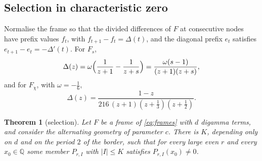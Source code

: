 \documentclass[11pt]{amsart}
\newtheorem{theorem}{Theorem}[section]
\theoremstyle{definition}
\theoremstyle{remark}
\numberwithin{equation}{section}
\newcommand{\Q}{\mathbb Q}
\begin{document}
\subsection{Selection in characteristic zero}\label{ssec:selection}
Normalise the frame so that the divided differences of $F$ at consecutive nodes have prefix values $f_t$, with
$f_{t+1}-f_t=\Delta(t)$, and the diagonal prefix $e_t$ satisfies $e_{t+1}-e_t=-\Delta'(t)$. For $F_s$,
\[
 \Delta(z)=\omega\Bigl(\frac1{z+1}-\frac1{z+s}\Bigr)=\frac{\omega(s-1)}{(z+1)(z+s)} ,
\]
and for $F_\chi$, with $\omega=-\frac16$,
\[
 \Delta(z)=\frac{1-z}{216\,(z+1)(z+\frac13)(z+\frac12)} .
\]

\begin{theorem}[selection]\label{thm:selection}
Let $F$ be a frame of \eqref{eq:frames} with $d$ digamma terms, and consider the alternating geometry of parameter $c$. There is
$K$, depending only on $d$ and on the period $2$ of the border, such that for every large even $r$ and every $x_0\in\Q$ some
member $P_{r,I}$ with $|I|\le K$ satisfies $P_{r,I}(x_0)\ne0$.
\end{theorem}
\end{document}
